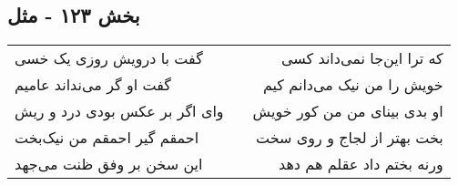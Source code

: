 \begin{center}
\section*{بخش ۱۲۳ - مثل}
\label{sec:sh123}
\begin{longtable}{l p{0.5cm} r}
گفت با درویش روزی یک خسی
&&
که ترا این‌جا نمی‌داند کسی
\\
گفت او گر می‌نداند عامیم
&&
خویش را من نیک می‌دانم کیم
\\
وای اگر بر عکس بودی درد و ریش
&&
او بدی بینای من من کور خویش
\\
احمقم گیر احمقم من نیک‌بخت
&&
بخت بهتر از لجاج و روی سخت
\\
این سخن بر وفق ظنت می‌جهد
&&
ورنه بختم داد عقلم هم دهد
\\
\end{longtable}
\end{center}
